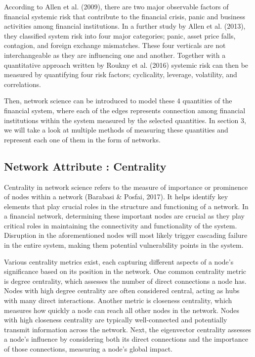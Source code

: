 \documentclass[a4paper,11pt]{article}
\begin{document}
According to Allen et al. (2009), there are two major observable factors of financial systemic risk that contribute to the financial crisis, panic and business activities among financial institutions. In a further study by Allen et al. (2013), they classified system risk into four major categories; panic, asset price falls, contagion, and foreign exchange mismatches. These four verticals are not interchangeable as they are influencing one and another. Together with a quantitative approach written by Roukny et al. (2016) systemic risk can then be measured by quantifying four risk factors; cyclicality, leverage, volatility, and correlations.

Then, network science can be introduced to model these 4 quantities of the financial system, where each of the edges represents connection among financial institutions within the system measured by the selected quantities. In section 3, we will take a look at multiple methods of measuring these quantities and represent each one of them in the form of networks.

\subsection{Network Attribute : Centrality}
Centrality in network science refers to the measure of importance or prominence of nodes within a network (Barabasi \& Posfai, 2017). It helps identify key elements that play crucial roles in the structure and functioning of a network. In a financial network, determining these important nodes are crucial as they play critical roles in maintaining the connectivity and functionality of the system. Disruption in the aforementioned nodes will most likely trigger cascading failure in the entire system, making them potential vulnerability points in the system.

Various centrality metrics exist, each capturing different aspects of a node’s significance based on its position in the network. One common centrality metric is degree centrality, which assesses the number of direct connections a node has. Nodes with high degree centrality are often considered central, acting as hubs with many direct interactions. Another metric is closeness centrality, which measures how quickly a node can reach all other nodes in the network. Nodes with high closeness centrality are typically well-connected and potentially transmit information across the network. Next, the eigenvector centrality assesses a node’s influence by considering both its direct connections and the importance of those connections, measuring a node’s global impact.
\end{document}
